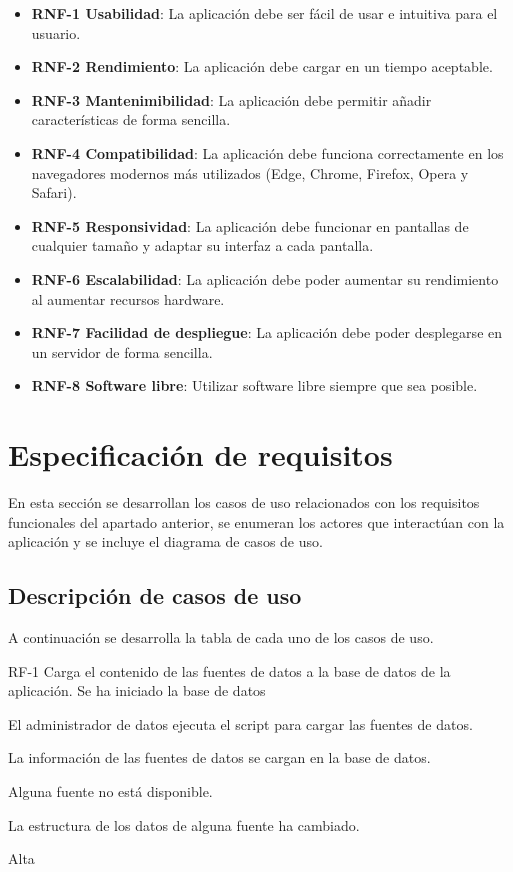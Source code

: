 \begin{itemize}
	\item \textbf{RNF-1 Usabilidad}: La aplicación debe ser fácil de usar e intuitiva para el usuario.
	\item \textbf{RNF-2 Rendimiento}: La aplicación debe cargar en un tiempo aceptable.
	\item \textbf{RNF-3 Mantenimibilidad}: La aplicación debe permitir añadir características de forma sencilla.
	\item \textbf{RNF-4 Compatibilidad}: La aplicación debe funciona correctamente en los navegadores modernos más utilizados (Edge, Chrome, Firefox, Opera y Safari).
	\item \textbf{RNF-5 Responsividad}: La aplicación debe funcionar en pantallas de cualquier tamaño y adaptar su interfaz a cada pantalla.
	\item \textbf{RNF-6 Escalabilidad}: La aplicación debe poder aumentar su rendimiento al aumentar recursos hardware.
	\item \textbf{RNF-7 Facilidad de despliegue}: La aplicación debe poder desplegarse en un servidor de forma sencilla.
	\item \textbf{RNF-8 Software libre}: Utilizar software libre siempre que sea posible.
\end{itemize}

\section{Especificación de requisitos}

En esta sección se desarrollan los casos de uso relacionados con los requisitos funcionales del apartado anterior, se enumeran los actores que interactúan con la aplicación y se incluye el diagrama de casos de uso.

\subsection{Descripción de casos de uso}

A continuación se desarrolla la tabla de cada uno de los casos de uso.
\newpage


{RF-1}
{Carga el contenido de las fuentes de datos a la base de datos de la aplicación.}
{Se ha iniciado la base de datos}
{
	\item El administrador de datos ejecuta el script para cargar las fuentes de datos.
}
{La información de las fuentes de datos se cargan en la base de datos.}
{
	\item Alguna fuente no está disponible.
	\item La estructura de los datos de alguna fuente ha cambiado.
}
{Alta}

